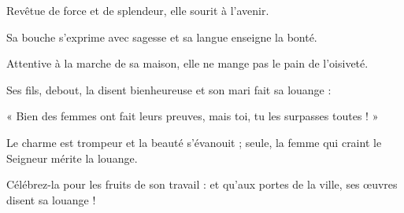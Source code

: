 
Revêtue de force et de splendeur, elle sourit à l’avenir.

Sa bouche s’exprime avec sagesse et sa langue enseigne la bonté.

Attentive à la marche de sa maison, elle ne mange pas le pain de l’oisiveté.

Ses fils, debout, la disent bienheureuse et son mari fait sa louange :

« Bien des femmes ont fait leurs preuves, mais toi, tu les surpasses toutes ! »

Le charme est trompeur et la beauté s’évanouit ; seule, la femme qui craint le Seigneur mérite la louange.

Célébrez-la pour les fruits de son travail : et qu’aux portes de la ville, ses œuvres disent sa louange !